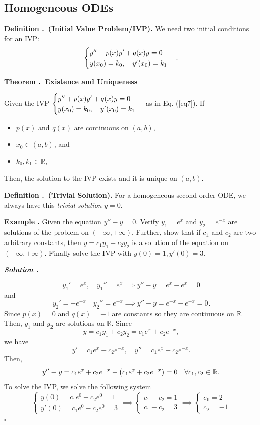 \documentclass[12pt, a4paper]{article}
\newcounter{index}[subsection]
\newenvironment*{df}[1]{\par\noindent\textbf{Definition \thesubsection.\stepcounter{index}\theindex\ (#1).}}{\par}
\newenvironment*{eg}{\begin{framed}\par\noindent\textbf{Example \thesubsection.\stepcounter{index}\theindex}}{\par\end{framed}}
\newenvironment*{thm}[1]{\begin{tcolorbox}\par\noindent\textbf{Theorem \thesubsection.\stepcounter{index}\theindex\ #1} \par}{\par\end{tcolorbox}}
\newcounter{nprf}[subsection]
\newenvironment*{sol}{\par\indent\textbf{\textit{Solution \stepcounter{nprf}\thenprf.}}\par}{\hfill{$\square$}\par}
\def\R{{\mathbb{R}}}
\begin{document}
\subsection{Homogeneous ODEs}
\begin{df}{Initial Value Problem/IVP}
	We need two initial conditions for an IVP: \begin{equation}\label{eq7}\begin{cases}y''+p(x)y'+q(x)y=0\\y\qty(x_0)=k_0,\quad y'\qty(x_0)=k_1\end{cases}.\end{equation}	
\end{df}
\begin{thm}{Existence and Uniqueness}
	Given the IVP $\begin{cases}y''+p(x)y'+q(x)y=0\\y\qty(x_0)=k_0,\quad y'\qty(x_0)=k_1\end{cases}$ as in Eq. (\ref{eq7}). If 
	\begin{itemize}
		\item $p(x)$ and $q(x)$ are continuous on $(a,b)$,
		\item $x_0\in(a,b)$, and 
		\item $k_0,k_1\in\R$,
	\end{itemize}
	Then, the solution to the IVP exists and it is unique on $(a,b)$.
\end{thm}
\begin{df}{Trivial Solution}
	For a homogeneous second order ODE, we always have this \textit{trivial solution} $y=0$.	
\end{df}
\begin{eg}
	Given the equation $y''-y=0$. Verify $y_1=e^x$ and $y_2=e^{-x}$ are solutions of the problem on $(-\infty,+\infty)$. Further, show that if $c_1$ and $c_2$ are two arbitrary constants, then $y=c_1y_1+c_2y_2$ is a solution of the equation on $(-\infty,+\infty)$. Finally solve the IVP with $y(0)=1, y'(0)=3$.
	\begin{sol}
		\[y_1'=e^x,\quad y_1''=e^x\implies y''-y=e^{x}-e^{x}=0\] and \[y_2'=-e^{-x}\quad y_2''=e^{-x}\implies y''-y=e^{-x}-e^{-x}=0.\] Since $p(x)=0$ and $q(x)=-1$ are constants so they are continuous on $\R$. Then, $y_1$ and $y_2$ are solutions on $\R$. Since\[y=c_1y_1+c_2y_2=c_1e^{x}+c_2e^{-x},\] we have \[y'=c_1e^{x}-c_2e^{-x},\quad y''=c_1e^{x}+c_2e^{-x}.\] Then, \[y''-y=c_1e^{x}+c_2e^{-x}-\qty(c_1e^{x}+c_2e^{-x})=0\quad\forall c_1,c_2\in\R.\] To solve the IVP, we solve the following system \[\begin{cases}y(0)=c_1e^{0}+c_2e^{0}=1\\y'(0)=c_1e^{0}-c_2e^{0}=3\end{cases}\implies\begin{cases}c_1+c_2=1\\c_1-c_2=3\end{cases}\implies\begin{cases}c_1=2\\c_2=-1\end{cases}\]
	\end{sol}
\end{eg}
\end{document}
